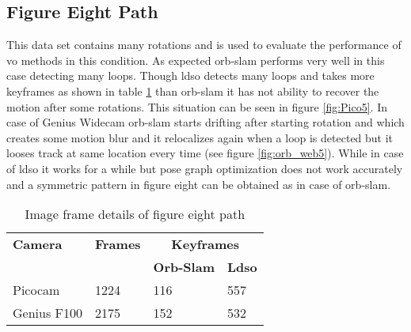 \subsection{Figure Eight Path}
This data set contains many rotations and is used to evaluate the performance of \acrshort{vo} methods in this condition. As expected \acrshort{orb}-\acrshort{slam} performs very well in this case detecting many loops. Though \acrshort{ldso} detects many loops and takes more keyframes as shown in table \ref{table:eight} than \acrshort{orb}-\acrshort{slam} it has not ability to recover the motion after some rotations. This situation can be seen in figure \ref{fig:Pico5}. In case of Genius Widecam \acrshort{orb}-\acrshort{slam} starts drifting after starting rotation and which creates some motion blur and it relocalizes again when a loop is detected but it looses track at same location every time (see figure \ref{fig:orb_web5}). While in case of \acrshort{ldso} it works for a while but pose graph optimization does not work accurately and a symmetric pattern in figure eight can be obtained as in case of \acrshort{orb}-\acrshort{slam}.\\
\begin{table}[H]
	\centering
	\renewcommand{\arraystretch}{1.5}
	\begin{tabular}{ l| l| l |l }
		\textbf{Camera} & \textbf{Frames} & \multicolumn{2}{c}{\textbf{Keyframes}}  \\    
		&      & \textbf{Orb-Slam}  & \textbf{Ldso}  \\
		\hline
		Picocam & 1224 &  116  & 557 \\ 
		\hline
		Genius F100 & 2175 &  152  & 532 \\ 
	\end{tabular}
	\caption{Image frame details of figure eight path}
	\label{table:eight}
\end{table}

